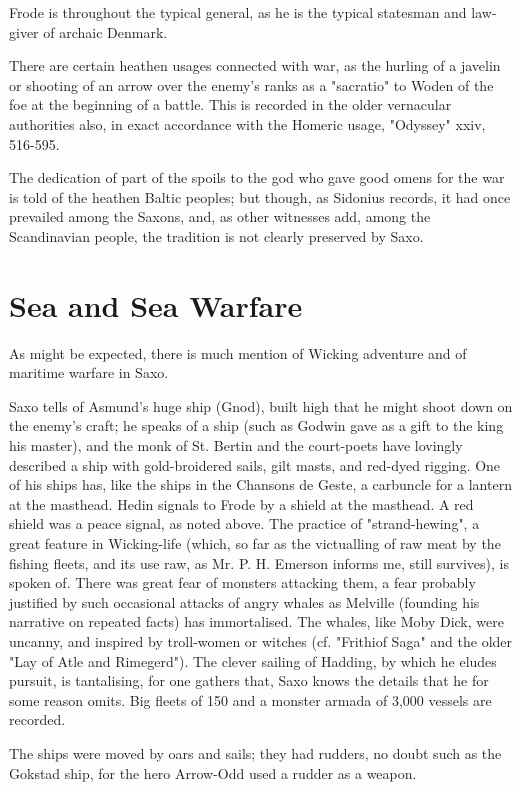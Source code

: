 \documentclass[10pt,a4paper]{report}
\begin{document}
Frode is throughout the typical general, as he is the typical statesman and law-giver of archaic Denmark.

There are certain heathen usages connected with war, as the hurling of a javelin or shooting of an arrow over the enemy's ranks as a "sacratio" to Woden of the foe at the beginning of a battle. This is recorded in the older vernacular authorities also, in exact accordance with the Homeric usage, "Odyssey" xxiv, 516-595.

The dedication of part of the spoils to the god who gave good omens for the war is told of the heathen Baltic peoples; but though, as Sidonius records, it had once prevailed among the Saxons, and, as other witnesses add, among the Scandinavian people, the tradition is not clearly preserved by Saxo.

\section{Sea and Sea Warfare}
As might be expected, there is much mention of Wicking adventure and of maritime warfare in Saxo.

Saxo tells of Asmund's huge ship (Gnod), built high that he might shoot down on the enemy's craft; he speaks of a ship (such as Godwin gave as a gift to the king his master), and the monk of St. Bertin and the court-poets have lovingly described a ship with gold-broidered sails, gilt masts, and red-dyed rigging. One of his ships has, like the ships in the Chansons de Geste, a carbuncle for a lantern at the masthead. Hedin signals to Frode by a shield at the masthead. A red shield was a peace signal, as noted above. The practice of "strand-hewing", a great feature in Wicking-life (which, so far as the victualling of raw meat by the fishing fleets, and its use raw, as Mr. P. H. Emerson informs me, still survives), is spoken of. There was great fear of monsters attacking them, a fear probably justified by such occasional attacks of angry whales as Melville (founding his narrative on repeated facts) has immortalised. The whales, like Moby Dick, were uncanny, and inspired by troll-women or witches (cf. "Frithiof Saga" and the older "Lay of Atle and Rimegerd"). The clever sailing of Hadding, by which he eludes pursuit, is tantalising, for one gathers that, Saxo knows the details that he for some reason omits. Big fleets of 150 and a monster armada of 3,000 vessels are recorded.

The ships were moved by oars and sails; they had rudders, no doubt such as the Gokstad ship, for the hero Arrow-Odd used a rudder as a weapon.
\end{document}
